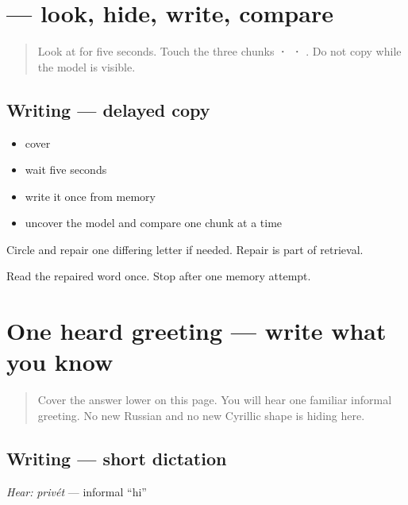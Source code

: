 \section[\texorpdfstring{\ru{привет} (privét)}{привет (privét)}]{ — look, hide, write, compare}

\label{lesson:RU-W05-privet-delayed-copy}



\begin{quote}
Look at \textbf{} for five seconds. Touch the three chunks \textbf{ ·  · }. Do not copy while the model is visible.
\end{quote}

\subsection*{Writing — delayed copy}
\begin{itemize}
\raggedright
  \item cover \textbf{}
  \item wait five seconds
  \item write it once from memory
  \item uncover the model and compare one chunk at a time
\end{itemize}

Circle and repair one differing letter if needed. Repair is part of retrieval.

\begin{tcolorbox}[breakable,colback=teal!4,colframe=teal!35!black,title={Before you move on}]
Read the repaired word once. Stop after one memory attempt.
\end{tcolorbox}
\section[\texorpdfstring{\ru{привет} (privét)}{привет (privét)}]{One heard greeting — write what you know}

\label{lesson:RU-W05-privet-dictation}



\begin{quote}
Cover the answer lower on this page. You will hear one familiar informal greeting. No new Russian and no new Cyrillic shape is hiding here.
\end{quote}

\subsection*{Writing — short dictation}
\emph{Hear:} \emph{privét} — informal \textquotedblleft{}hi\textquotedblright{}

